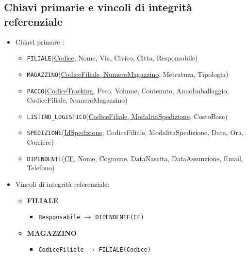\subsection{Chiavi primarie e vincoli di integrità referenziale}
    \begin{itemize}
        \item Chiavi primare :
            \begin{itemize}
                \item \texttt{FILIALE}(\underline{Codice}, Nome, Via, Civico, Citta, Responsabile)
                
                \item \texttt{MAGAZZINO}(\underline{CodiceFiliale, NumeroMagazzino}, Metratura, Tipologia)
                
                \item \texttt{PACCO}(\underline{CodiceTracking}, Peso, Volume, Contenuto, AnnoImballaggio, CodiceFiliale, NumeroMagazzino)
                
                \item \texttt{LISTINO\_LOGISTICO}(\underline{CodiceFiliale, ModalitaSpedizione}, CostoBase)
                
                \item \texttt{SPEDIZIONE}(\underline{IdSpedizione}, CodiceFiliale, ModalitaSpedizione, Data, Ora, Corriere)
                
                \item \texttt{DIPENDENTE}(\underline{CF}, Nome, Cognome, DataNascita, DataAssunzione, Email, Telefono)
            \end{itemize}
            \item Vincoli di integrità referenziale:
            \begin{itemize}
            \item \textbf{FILIALE}
            \begin{itemize}
                \item \texttt{Responsabile} $\to$ \texttt{DIPENDENTE(CF)}
            \end{itemize}

            \item \textbf{MAGAZZINO}
            \begin{itemize}
                \item \texttt{CodiceFiliale} $\to$ \texttt{FILIALE(Codice)}
            \end{itemize}


\end{itemize}
\end{itemize}
